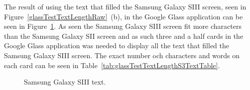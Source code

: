 The result of using the text that filled the Samsung Galaxy SIII screen, seen in Figure~\ref{glassTestTextLengthRaw}~(b), in the Google Glass application can be seen in Figure~\ref{glassTestTextLengthS3Text}. As seen the Samsung Galaxy SIII screen fit more characters than the Samsung Galaxy SII screen and as such three and a half cards in the Google Glass application was needed to display all the text that filled the Samsung Galaxy SIII screen. The exact number och characters and words on each card can be seen in Table~\ref{tab:glassTestTextLengthS3TextTable}.

	\begin{figure}[H]%
		\centering
   		 \qquad
   		 \qquad
   		 \qquad
   		 \qquad
		\caption{Samsung Galaxy SIII text.}
		\label{glassTestTextLengthS3Text}
	\end{figure}

